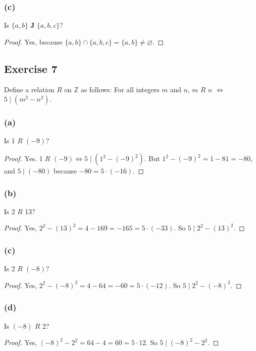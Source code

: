 \documentclass[14pt]{extarticle}
\newcommand{\es}{\varnothing}
\newcommand{\Z}{\mathbb{Z}}
\begin{document}
\subsubsection{(c)}
Is $\{a, b\}$ {\bf J} $\{a, b, c\}$?

\begin{proof}
        Yes, because \(\{a,b\} \cap \{a,b,c\} = \{a,b\} \neq \es\).
\end{proof}

\subsection{Exercise 7}
Define a relation $R$ on $\Z$ as follows: For all integers $m$ and $n$, $m$ $R$ $n$ $\iff$ \(5 \mid (m^2 - n^2)\).

\subsubsection{(a)}
Is 1 $R$ $(-9)$?

\begin{proof}
        Yes. 1 $R$ \((-9) \iff 5 \mid (1^2 - (-9)^2)\). But \(1^2 - (-9)^2 = 1 - 81 = -80\), and \(5 \mid (-80)\) because
        \(-80 = 5 \cdot (-16)\).
\end{proof}

\subsubsection{(b)}
Is 2 $R$ 13?

\begin{proof}
        Yes, \(2^2 - (13)^2 = 4 - 169 = -165 = 5 \cdot (-33)\). So \(5 \mid 2^2 - (13)^2\).
\end{proof}

\subsubsection{(c)}
Is 2 $R$ $(-8)$?

\begin{proof}
        Yes, \(2^2 - (-8)^2 = 4 - 64 = -60 = 5 \cdot (-12)\). So \(5 \mid 2^2 - (-8)^2\).
\end{proof}

\subsubsection{(d)}
Is $(-8)$ $R$ 2?

\begin{proof}
        Yes, \((-8)^2 - 2^2 = 64 - 4 = 60 = 5 \cdot 12\). So \(5 \mid (-8)^2 - 2^2\).
\end{proof}
\end{document}
